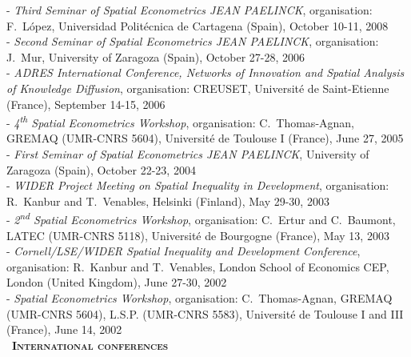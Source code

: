 \documentclass[a4paper,12pt]{article}
\newcommand{\smalltitre}[1]{%
	\noindent \textbullet~\textsc{\textbf{#1}}
	\smallskip
	}
\begin{document}
- \textit{Third Seminar of Spatial Econometrics JEAN PAELINCK}, organisation: F.~López, Universidad Politécnica de Cartagena (Spain), October 10-11, 2008 \\
- \textit {Second Seminar of Spatial Econometrics JEAN PAELINCK}, organisation: J.~Mur, University of Zaragoza (Spain), October 27-28, 2006 \\
- \textit{ADRES International Conference, Networks of Innovation and Spatial Analysis of Knowledge Diffusion}, organisation: CREUSET, Université de Saint-Etienne (France), September 14-15, 2006 \\
- \textit{4\textsuperscript{th} Spatial Econometrics Workshop}, organisation: C.~Thomas-Agnan, GREMAQ (UMR-CNRS 5604), Université de Toulouse I (France), June 27, 2005 \\
- \textit{First Seminar of Spatial Econometrics JEAN PAELINCK}, University of Zaragoza (Spain), October 22-23, 2004 \\
- \textit{WIDER Project Meeting on Spatial Inequality in Development}, organisation: R.~Kanbur and T.~Venables, Helsinki (Finland), May 29-30, 2003 \\
- \textit{2\textsuperscript{nd} Spatial Econometrics Workshop}, organisation: C.~Ertur and C.~Baumont, LATEC (UMR-CNRS 5118), Université de Bourgogne (France), May 13, 2003 \\
- \textit{Cornell/LSE/WIDER Spatial Inequality and Development Conference}, organisation: R.~Kanbur and T.~Venables, London School of Economics CEP, London (United Kingdom), June 27-30, 2002 \\
- \textit{Spatial Econometrics Workshop}, organisation: C.~Thomas-Agnan, GREMAQ (UMR-CNRS 5604), L.S.P. (UMR-CNRS 5583), Université de Toulouse I and III (France), June 14, 2002 \\


\smalltitre{International conferences}
\end{document}
